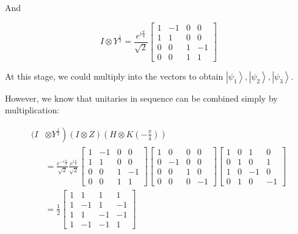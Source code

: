 \documentclass[main.tex]{subfiles}
\begin{document}
    And
    
    $$
    I \otimes Y^{\frac{1}{2}}=\frac{e^{i \frac{\pi}{4}}}{\sqrt{2}}\left[\begin{array}{cccc}
    1 & -1 & 0 & 0 \\
    1 & 1 & 0 & 0 \\
    0 & 0 & 1 & -1 \\
    0 & 0 & 1 & 1
    \end{array}\right]
    $$
    
    At this stage, we could multiply into the vectors to obtain $\left|\psi_{1}\right\rangle,\left|\psi_{2}\right\rangle,\left|\psi_{3}\right\rangle$.
    
    However, we know that unitaries in sequence can be combined simply by multiplication:
    
    $$
    \begin{aligned}
    (I&\left.\otimes Y^{\frac{1}{2}}\right)(I \otimes Z)\left(H \otimes K\left(-\frac{\pi}{4}\right)\right) \\
    &=\frac{e^{-i \frac{\pi}{4}}}{\sqrt{2}} \frac{e^{i \frac{\pi}{4}}}{\sqrt{2}}\left[\begin{array}{cccc}
    1 & -1 & 0 & 0 \\
    1 & 1 & 0 & 0 \\
    0 & 0 & 1 & -1 \\
    0 & 0 & 1 & 1
    \end{array}\right]\left[\begin{array}{cccc}
    1 & 0 & 0 & 0 \\
    0 & -1 & 0 & 0 \\
    0 & 0 & 1 & 0 \\
    0 & 0 & 0 & -1
    \end{array}\right]\left[\begin{array}{cccc}
    1 & 0 & 1 & 0 \\
    0 & 1 & 0 & 1 \\
    1 & 0 & -1 & 0 \\
    0 & 1 & 0 & -1
    \end{array}\right] \\
    &=\frac{1}{2}\left[\begin{array}{cccc}
    1 & 1 & 1 & 1 \\
    1 & -1 & 1 & -1 \\
    1 & 1 & -1 & -1 \\
    1 & -1 & -1 & 1
    \end{array}\right]
    \end{aligned}
    $$
\end{document}
